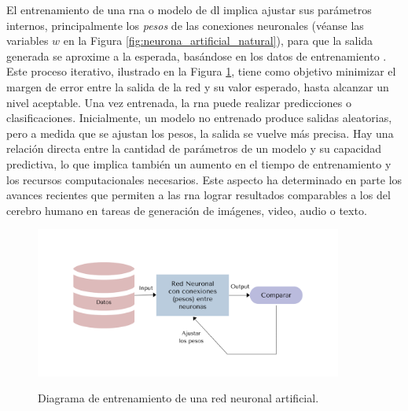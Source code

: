 El entrenamiento de una \gls{rna} o modelo de \gls{dl} implica ajustar sus parámetros internos, principalmente los \emph{pesos} de las conexiones neuronales (véanse las variables $w$ en la Figura \ref{fig:neurona_artificial_natural}), para que la salida generada se aproxime a la esperada, basándose en los datos de entrenamiento \citep{NurArtificialNeural2014}. Este proceso iterativo, ilustrado en la Figura \ref{fig:ann_training}, tiene como objetivo minimizar el margen de error entre la salida de la red y su valor esperado, hasta alcanzar un nivel aceptable. Una vez entrenada, la \gls{rna} puede realizar predicciones o clasificaciones. Inicialmente, un modelo no entrenado produce salidas aleatorias, pero a medida que se ajustan los pesos, la salida se vuelve más precisa. Hay una relación directa entre la cantidad de parámetros de un modelo y su capacidad predictiva, lo que implica también un aumento en el tiempo de entrenamiento y los recursos computacionales necesarios. Este aspecto ha determinado en parte los avances recientes que permiten a las \gls{rna} lograr resultados comparables a los del cerebro humano en tareas de generación de imágenes, video, audio o texto.

\begin{figure}[H]
    \caption[Diagrama de entrenamiento de una red neuronal artificial]{Diagrama de entrenamiento de una red neuronal artificial.}
    \centering
    \includegraphics[width=0.9\textwidth]{./figuras/ann_training.png}
    \source{\propio}
    \label{fig:ann_training}
\end{figure}

